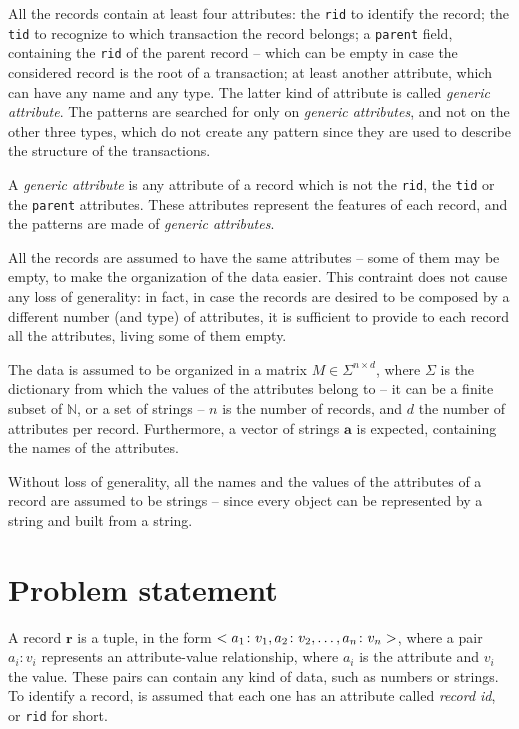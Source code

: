 \documentclass{acm_proc_article-sp-sigmod09}
\begin{document}
All the records contain at least four attributes: the \texttt{rid} to identify the record; the \texttt{tid} to recognize to which transaction the record belongs; a \texttt{parent} field, containing the \texttt{rid} of the parent record -- which can be empty in case the considered record is the root of a transaction; at least another attribute, which can have any name and any type. The latter kind of attribute is called \emph{generic attribute}. The patterns are searched for only on \emph{generic attributes}, and not on the other three types, which do not create any pattern since they are used to describe the structure of the transactions.

\begin{definition}
A \emph{generic attribute} is any attribute of a record which is not the \texttt{rid}, the \texttt{tid} or the \texttt{parent} attributes. These attributes represent the features of each record, and the patterns are made of \emph{generic attributes}.
\end{definition}

All the records are assumed to have the same attributes -- some of them may be empty, to make the organization of the data easier. This contraint does not cause any loss of generality: in fact, in case the records are desired to be composed by a different number (and type) of attributes, it is sufficient to provide to each record all the attributes, living some of them empty.

The data is assumed to be organized in a matrix $M \in \Sigma^{n \times d}$, where $\Sigma$ is the dictionary from which the values of the attributes belong to -- it can be a finite subset of $\mathbb{N}$, or a set of strings -- $n$ is the number of records, and $d$ the number of attributes per record. Furthermore, a vector of strings $\boldsymbol{a}$ is expected, containing the names of the attributes.

Without loss of generality, all the names and the values of the attributes of a record are assumed to be strings -- since every object can be represented by a string and built from a string.

\section{Problem statement}
A record $\boldsymbol{r}$ is a tuple, in the form $<a_1 \colon v_1, a_2 \colon v_2, \text{\dots}, a_n \colon v_n>$, where a pair $a_i \colon v_i$ represents an attribute-value relationship, where $a_i$ is the attribute and $v_i$ the value. These pairs can contain any kind of data, such as numbers or strings. To identify a record, is assumed that each one has an attribute called \emph{record id}, or \texttt{rid} for short.
\end{document}
